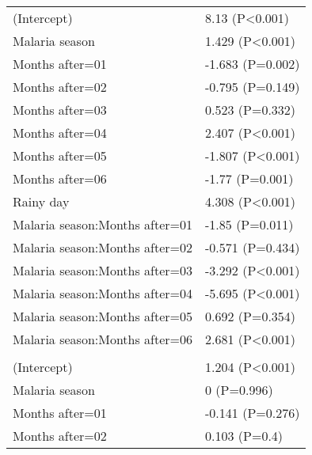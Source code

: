 \documentclass[]{article}
\begin{document}
\begin{longtable}[t]{ll}
\hspace{1em}(Intercept) & 8.13 (P<0.001)\\
\hspace{1em}Malaria season & 1.429 (P<0.001)\\
\hspace{1em}Months after=01 & -1.683 (P=0.002)\\
\hspace{1em}Months after=02 & -0.795 (P=0.149)\\
\hspace{1em}Months after=03 & 0.523 (P=0.332)\\
\hspace{1em}Months after=04 & 2.407 (P<0.001)\\
\hspace{1em}Months after=05 & -1.807 (P<0.001)\\
\hspace{1em}Months after=06 & -1.77 (P=0.001)\\
\hspace{1em}Rainy day & 4.308 (P<0.001)\\
\hspace{1em}Malaria season:Months after=01 & -1.85 (P=0.011)\\
\hspace{1em}Malaria season:Months after=02 & -0.571 (P=0.434)\\
\hspace{1em}Malaria season:Months after=03 & -3.292 (P<0.001)\\
\hspace{1em}Malaria season:Months after=04 & -5.695 (P<0.001)\\
\hspace{1em}Malaria season:Months after=05 & 0.692 (P=0.354)\\
\hspace{1em}Malaria season:Months after=06 & 2.681 (P<0.001)\\
\addlinespace[1.5em]
\multicolumn{2}{l}{\textbf{Temporary field worker}}\\
\hspace{1em}(Intercept) & 1.204 (P<0.001)\\
\hspace{1em}Malaria season & 0 (P=0.996)\\
\hspace{1em}Months after=01 & -0.141 (P=0.276)\\
\hspace{1em}Months after=02 & 0.103 (P=0.4)\\

\end{longtable}
\end{document}
